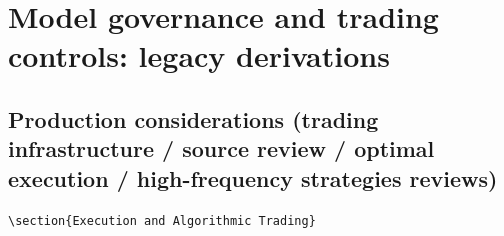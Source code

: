 \documentclass[a4paper,oneside,openany]{book}
\begin{document}
\chapter*{Model governance and trading controls: legacy derivations}

\section*{Production considerations (trading infrastructure / source review / optimal execution / high-frequency strategies reviews)}

{\scriptsize
\begin{verbatim}
\section{Execution and Algorithmic Trading}



\end{verbatim}
}

\end{document}
